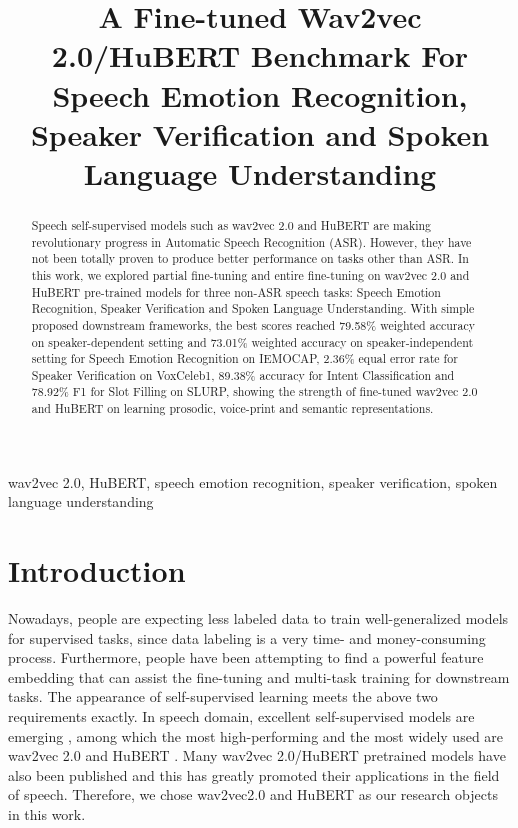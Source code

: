 \documentclass{article}
\title{A Fine-tuned Wav2vec 2.0/HuBERT Benchmark For Speech Emotion Recognition, Speaker Verification and Spoken Language Understanding}
\begin{document}
\maketitle
\begin{abstract}
Speech self-supervised models such as wav2vec 2.0 and HuBERT are making revolutionary progress in Automatic Speech Recognition (ASR). However, they have not been totally proven to produce better performance on tasks other than ASR. In this work, we explored partial fine-tuning and entire fine-tuning on wav2vec 2.0 and HuBERT pre-trained models for three non-ASR speech tasks: Speech Emotion Recognition, Speaker Verification and Spoken Language Understanding. With simple proposed downstream frameworks, the best scores reached 79.58\% weighted accuracy on speaker-dependent setting and 73.01\% weighted accuracy on speaker-independent setting for Speech Emotion Recognition on IEMOCAP, 2.36\% equal error rate for Speaker Verification on VoxCeleb1, 89.38\% accuracy for Intent Classification and 78.92\% F1 for Slot Filling on SLURP, showing the strength of fine-tuned wav2vec 2.0 and HuBERT on learning prosodic, voice-print and semantic representations.
\end{abstract}
\begin{keywords}
wav2vec 2.0, HuBERT, speech emotion recognition, speaker verification, spoken language understanding
\end{keywords}
\section{Introduction}

Nowadays, people are expecting less labeled data to train well-generalized models for supervised tasks, since data labeling is a very time- and money-consuming process. Furthermore, people have been attempting to find a powerful feature embedding that can assist the fine-tuning and multi-task training for downstream tasks. The appearance of self-supervised learning meets the above two requirements exactly. In speech domain, excellent self-supervised models are emerging \cite{APC, NPC, MOCKINGJAY, TERA, PASE+, wav2vec, vq-wav2vec, wavLM, unispeech}, among which the most high-performing and the most widely used are wav2vec 2.0 \cite{wav2vec2} and HuBERT \cite{HuBERT}. Many wav2vec 2.0/HuBERT pretrained models have also been published and this has greatly promoted their applications in the field of speech. Therefore, we chose wav2vec2.0 and HuBERT as our research objects in this work.
\end{document}
